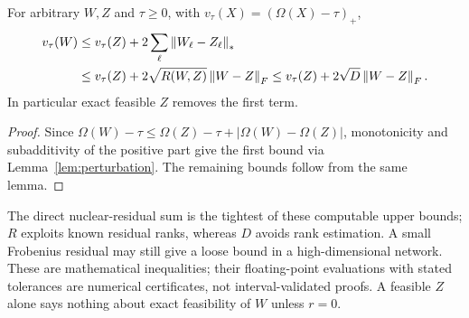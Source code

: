 \begin{proposition}\label{prop:feasibility}
For arbitrary $W,Z$ and $\tau\ge0$, with $v_\tau(X)=(\Omega(X)-\tau)_+$,
\begin{align}\label{eq:feasibility}
 v_\tau(W)&\le v_\tau(Z)+2\sum_\ell\left\lVert W_\ell-Z_\ell\right\rVert_*\\
 &\le v_\tau(Z)+2\sqrt{R(W,Z)}\left\lVert W-Z\right\rVert_F
 \le v_\tau(Z)+2\sqrt D\left\lVert W-Z\right\rVert_F.\nonumber
\end{align}
In particular exact feasible $Z$ removes the first term.
\end{proposition}
\begin{proof}
Since $\Omega(W)-\tau\le\Omega(Z)-\tau+|\Omega(W)-\Omega(Z)|$, monotonicity and subadditivity of the positive part give the first bound via Lemma~\ref{lem:perturbation}. The remaining bounds follow from the same lemma.
\end{proof}
The direct nuclear-residual sum is the tightest of these computable upper bounds; $R$ exploits known residual ranks, whereas $D$ avoids rank estimation. A small Frobenius residual may still give a loose bound in a high-dimensional network. These are mathematical inequalities; their floating-point evaluations with stated tolerances are numerical certificates, not interval-validated proofs. A feasible $Z$ alone says nothing about exact feasibility of $W$ unless $r=0$.

